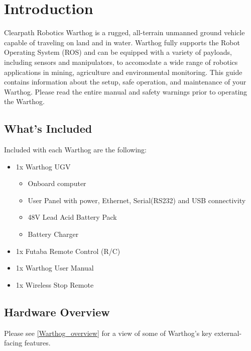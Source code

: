\documentclass[]{clearpath-latex/clearpath-manual}
\begin{document}
\tableofcontents

\section{Introduction}
Clearpath Robotics Warthog is a rugged, all-terrain unmanned ground vehicle capable of traveling on land and in water.  Warthog fully supports the Robot Operating System (ROS) and can be equipped with a variety of payloads, including sensors and manipulators, to accomodate a wide range of robotics applications in mining, agriculture and environmental monitoring. This guide contains information about the setup, safe operation, and maintenance of your Warthog.  Please read the entire manual and safety warnings prior to operating the Warthog.

\subsection{What's Included}

Included with each Warthog are the following:

\begin{itemize}[nolistsep]
  \item 1x Warthog UGV
  \begin{itemize}
    \item{Onboard computer}
    \item{User Panel with power, Ethernet, Serial(RS232) and USB connectivity}
    \item{48V Lead Acid Battery Pack}
    \item{Battery Charger}
  \end{itemize}
  \item 1x Futaba Remote Control (R/C)
  \item 1x Warthog User Manual
  \item 1x Wireless Stop Remote
\end{itemize}



\pagebreak[4]
\subsection{Hardware Overview}

Please see \autoref{Warthog_overview} for a view of some of Warthog's key external-facing features.
\end{document}
